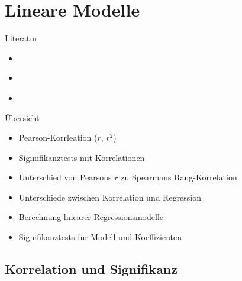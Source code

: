 \section[LMs]{Lineare Modelle}


\begin{frame}
  {Literatur}
  \begin{itemize}
    \item \cite{GravetterWallnau2007}
    \item \cite{ZuurEa2009}
    \item \cite{MaxwellDelaney2004}
  \end{itemize}
\end{frame}

\begin{frame}
  {Übersicht}
  \begin{itemize}[<+->]
    \item Pearson-Korrleation ($r$, $r^2$)
    \item Siginifikanztests mit Korrelationen
    \item Unterschied von Pearsons $r$ zu Spearmans Rang-Korrelation
    \item Unterschiede zwischen Korrelation und Regression
    \item Berechnung linearer Regressionsmodelle
    \item Signifikanztests für Modell und Koeffizienten
  \end{itemize}
\end{frame}

\subsection{Korrelation und Signifikanz}

